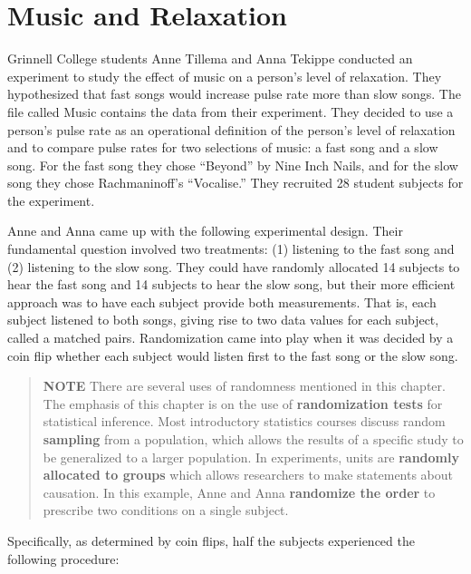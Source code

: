 \documentclass[
]{report}
\begin{document}
\hypertarget{music-and-relaxation}{%
\section*{Music and Relaxation}\label{music-and-relaxation}}

Grinnell College students Anne Tillema and Anna Tekippe conducted an experiment to study the effect of music on a person's level of relaxation. They hypothesized that fast songs would increase pulse rate more than slow songs. The file called Music contains the data from their experiment. They decided to use a person's pulse rate as an operational definition of the person's level of relaxation and to compare pulse rates for two selections of music: a fast song and a slow song. For the fast song they chose ``Beyond'' by Nine Inch Nails, and for the slow song they chose Rachmaninoff's ``Vocalise.'' They recruited 28 student subjects for the experiment.

Anne and Anna came up with the following experimental design. Their fundamental question
involved two treatments: (1) listening to the fast song and (2) listening to the slow song. They could have randomly allocated 14 subjects to hear the fast song and 14 subjects to hear the slow song, but their more efficient approach was to have each subject provide both measurements. That is, each subject listened to both songs, giving rise to two data values for each subject, called a matched pairs. Randomization came into play when it was decided by a coin flip whether each subject would listen first to the fast song or the slow song.

\begin{quote}
\textbf{NOTE} There are several uses of randomness mentioned in this chapter. The emphasis of this chapter is on the use of \textbf{randomization tests} for statistical inference. Most introductory statistics courses discuss random \textbf{sampling} from a population, which allows the results of a specific study to be generalized to a larger
population. In experiments, units are \textbf{randomly allocated to groups} which allows researchers to make statements about causation. In this example, Anne and Anna \textbf{randomize the order} to prescribe two conditions on a single subject.
\end{quote}

Specifically, as determined by coin flips, half the subjects experienced the following procedure:
\end{document}
